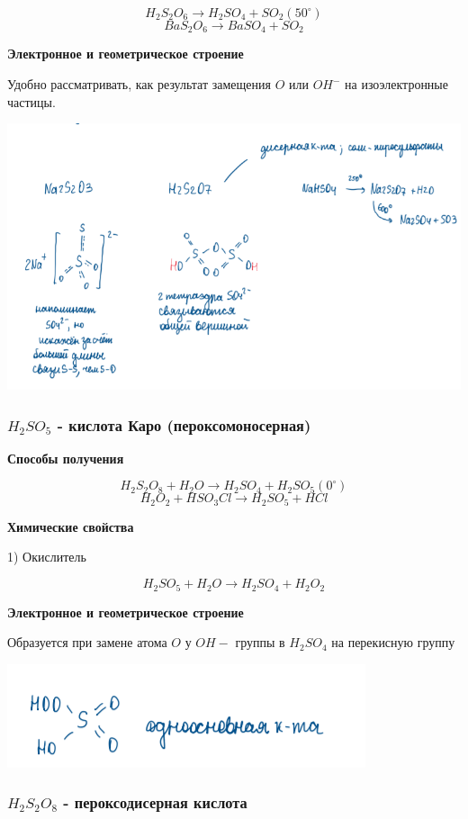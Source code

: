 $$H_2S_2O_6 \rightarrow H_2SO_4 + SO_2 (50^{\circ})$$
$$BaS_2O_6 \rightarrow BaSO_4 + SO_2$$

\textbf{Электронное и геометрическое строение}

Удобно рассматривать, как результат замещения $O$ или $OH^-$ на изоэлектронные частицы.

\includegraphics{images/7v8.png}

\subsubsection*{$H_2SO_5$ - кислота Каро (пероксомоносерная)}

\textbf{Способы получения}

$$H_2S_2O_8 + H_2O \rightarrow H_2SO_4 + H_2SO_5(0^{\circ})$$
$$H_2O_2 + HSO_3Cl \rightarrow H_2SO_5 + HCl$$

\textbf{Химические свойства}

1) Окислитель

$$H_2SO_5 + H_2O \rightarrow H_2SO_4 + H_2O_2$$

\textbf{Электронное и геометрическое строение}

Образуется при замене атома $O$ у $OH-$ группы в $H_2SO_4$ на перекисную группу

\includegraphics{images/7v9.png}

\subsubsection*{$H_2S_2O_8$ - пероксодисерная кислота}


